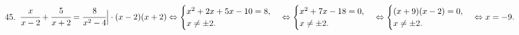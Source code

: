 45. $\cfrac{x}{x-2}+\cfrac{5}{x+2}=\cfrac{8}{x^2-4}\Big|\cdot(x-2)(x+2)\Leftrightarrow\begin{cases}x^2+2x+5x-10=8,\\x\neq\pm2.\end{cases}
\Leftrightarrow\begin{cases}x^2+7x-18=0,\\x\neq\pm2.\end{cases}\Leftrightarrow\begin{cases}(x+9)(x-2)=0,\\x\neq\pm2.\end{cases}\Leftrightarrow x=-9.$\\
